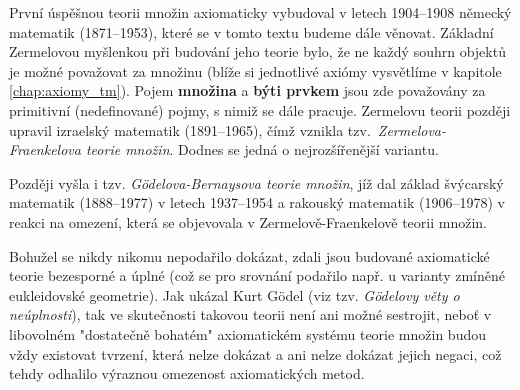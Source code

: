 První úspěšnou teorii množin axiomaticky vybudoval v letech 1904--1908 německý matematik  (1871--1953), které se v tomto textu budeme dále věnovat. Základní Zermelovou myšlenkou při budování jeho teorie bylo, že ne každý souhrn objektů je možné považovat za množinu (blíže si jednotlivé axiómy vysvětlíme v kapitole \ref{chap:axiomy_tm}). Pojem \textbf{množina} a \textbf{býti prvkem} jsou zde považovány za primitivní (nedefinované) pojmy, s nimiž se dále pracuje. Zermelovu teorii později upravil izraelský matematik  (1891--1965), čímž vznikla tzv.~\emph{Zermelova-Fraenkelova teorie množin}. Dodnes se jedná o nejrozšířenější variantu.\par
Později vyšla i tzv. \emph{Gödelova-Bernaysova teorie množin}, jíž dal základ švýcarský matematik  (1888--1977) v letech 1937--1954 a rakouský matematik  (1906--1978) v reakci na omezení, která se objevovala v Zermelově-Fraenkelově teorii množin.

Bohužel se nikdy nikomu nepodařilo dokázat, zdali jsou budované axiomatické teorie bezesporné a úplné (což se pro srovnání podařilo např. u varianty zmíněné eukleidovské geometrie). Jak ukázal Kurt Gödel (viz tzv. \emph{Gödelovy věty o neúplnosti}), tak ve skutečnosti takovou teorii není ani možné sestrojit, neboť v libovolném "dostatečně bohatém" axiomatickém systému teorie množin budou vždy existovat tvrzení, která nelze dokázat a ani nelze dokázat jejich negaci, což tehdy odhalilo výraznou omezenost axiomatických metod. 